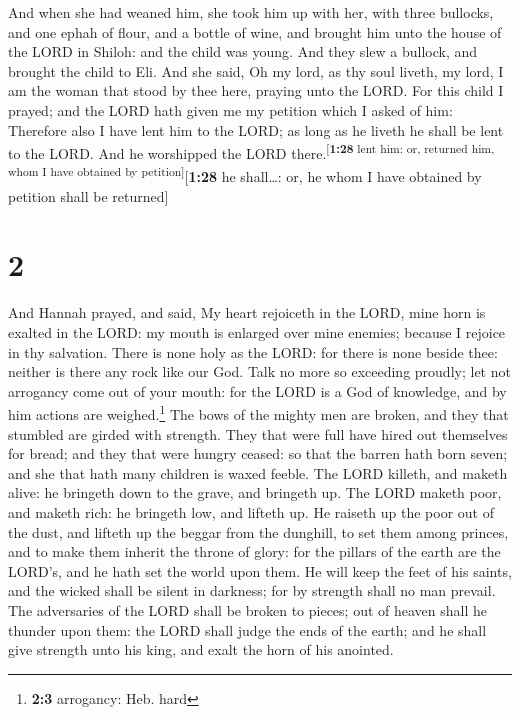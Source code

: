  And when she had weaned him, she took him up with her,
with three bullocks, and one ephah of flour, and a bottle of wine, and
brought him unto the house of the LORD in Shiloh: and the child was
young.  And they slew a bullock, and brought the child to
Eli.  And she said, Oh my lord, as thy soul liveth, my
lord, I am the woman that stood by thee here, praying unto the LORD.
 For this child I prayed; and the LORD hath given me my
petition which I asked of him:  Therefore also I have
lent him to the LORD; as long as he liveth he shall be lent to the LORD.
And he worshipped the LORD there.\textsuperscript{{[}\textbf{1:28} lent
him: or, returned him, whom I have obtained by
petition{]}}{[}\textbf{1:28} he shall\ldots: or, he whom I have obtained
by petition shall be returned{]}

\hypertarget{section-1}{%
\section{2}\label{section-1}}

 And Hannah prayed, and said, My heart rejoiceth in the
LORD, mine horn is exalted in the LORD: my mouth is enlarged over mine
enemies; because I rejoice in thy salvation.  There is
none holy as the LORD: for there is none beside thee: neither is there
any rock like our God.  Talk no more so exceeding proudly;
let not arrogancy come out of your mouth: for the LORD is a God of
knowledge, and by him actions are weighed.\footnote{\textbf{2:3}
  arrogancy: Heb. hard}  The bows of the mighty men are
broken, and they that stumbled are girded with strength. 
They that were full have hired out themselves for bread; and they that
were hungry ceased: so that the barren hath born seven; and she that
hath many children is waxed feeble.  The LORD killeth, and
maketh alive: he bringeth down to the grave, and bringeth up.
 The LORD maketh poor, and maketh rich: he bringeth low,
and lifteth up.  He raiseth up the poor out of the dust,
and lifteth up the beggar from the dunghill, to set them among princes,
and to make them inherit the throne of glory: for the pillars of the
earth are the LORD's, and he hath set the world upon them.
 He will keep the feet of his saints, and the wicked shall
be silent in darkness; for by strength shall no man prevail.
 The adversaries of the LORD shall be broken to pieces;
out of heaven shall he thunder upon them: the LORD shall judge the ends
of the earth; and he shall give strength unto his king, and exalt the
horn of his anointed.

